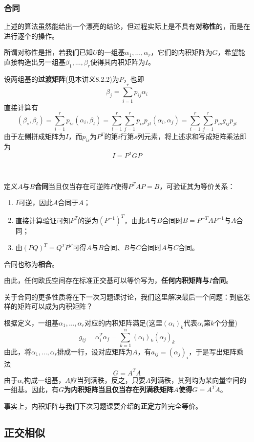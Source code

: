 \documentclass[a4paper,UTF8,fontset=windows]{ctexart}
\newcommand*{\note}{\noindent *}
\begin{document}
\subsubsection{合同}
上述的算法虽然能给出一个漂亮的结论，但过程实际上是不具有\textbf{对称性}的，而是在进行逐个的操作。

所谓对称性是指，若我们已知$U$的一组基$\alpha_1,\dots,\alpha_r$，它们的内积矩阵为$G$，希望能直接构造出另一组基$\beta_1,\dots,\beta_r$使得其内积矩阵为$I$。

设两组基的\textbf{过渡矩阵}(见本讲义8.2.2)为$P$，也即
$$\beta_j=\sum_{i=1}^rp_{ij}\alpha_i$$
直接计算有
$$(\beta_s,\beta_t)=\sum_{i=1}^rp_{is}(\alpha_i,\beta_t)=\sum_{i=1}^r\sum_{j=1}^rp_{is}p_{jt}(\alpha_i,\alpha_j)=\sum_{i=1}^r\sum_{j=1}^rp_{is}g_{ij}p_{jt}$$
由于左侧拼成矩阵为$I$，而$p_{is}$为$P^T$的第$i$行第$s$列元素，将上述求和写成矩阵乘法即为
$$I=P^TGP$$

\

定义$A$与$B$\textbf{合同}当且仅当存在可逆阵$P$使得$P^TAP=B$，可验证其为等价关系：
\begin{enumerate}
    \item $I$可逆，因此$A$合同于$A$；
    \item 直接计算验证可知$P^T$的逆为$(P^{-1})^T$，由此$A$与$B$合同时$B=P^{-T}AP^{-1}$与$A$合同；
    \item 由$(PQ)^T=Q^TP^T$可得$A$与$B$合同、$B$与$C$合同时$A$与$C$合同。
\end{enumerate}

\note 合同也称为\textbf{相合}。

由此，任何欧氏空间存在标准正交基可以等价写为，\textbf{任何内积矩阵与$I$合同}。

关于合同的更多性质将在下一次习题课讨论，我们这里解决最后一个问题：到底怎样的矩阵可以成为内积矩阵？

根据定义，一组基$\alpha_1,\dots,\alpha_r$对应的内积矩阵满足(这里$(\alpha_i)_k$代表$\alpha_i$第$k$个分量)
$$g_{ij}=\alpha_i^T\alpha_j=\sum_{k=1}^n(\alpha_i)_k(\alpha_j)_k$$
由此，将$\alpha_1,\dots,\alpha_r$排成一行，设对应矩阵为$A$，有$a_{ij}=(\alpha_j)_i$，于是写出矩阵乘法
$$G=A^TA$$
由于$\alpha_i$构成一组基，$A$应当列满秩，反之，只要$A$列满秩，其列均为某向量空间的一组基。因此，有\textbf{$G$为内积矩阵当且仅当存在列满秩矩阵$A$使得$G=A^TA$}。

\note 事实上，内积矩阵与我们下次习题课要介绍的\textbf{正定}方阵完全等价。

\subsection{正交相似}
\end{document}

